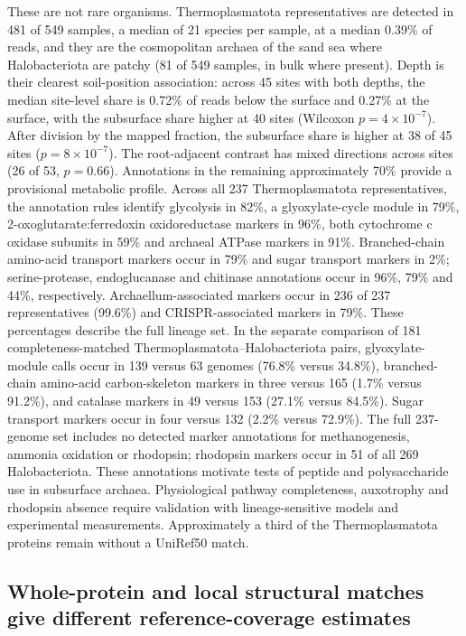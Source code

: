 \documentclass[11pt]{article}
\begin{document}
These are not rare organisms. Thermoplasmatota representatives are detected in 481 of 549 samples,
a median of 21 species per sample, at a median 0.39\% of reads, and they are the cosmopolitan archaea
of the sand sea where Halobacteriota are patchy (81 of 549 samples, in bulk where present). Depth is
their clearest soil-position association: across 45 sites with both depths, the median site-level
share is 0.72\% of reads below the surface and 0.27\% at the surface, with the subsurface share
higher at 40 sites (Wilcoxon $p = 4 \times 10^{-7}$). After division by the mapped fraction,
the subsurface share is higher at 38 of 45 sites ($p = 8 \times 10^{-7}$).
The root-adjacent contrast has mixed directions across sites (26 of 53, $p = 0.66$).
Annotations in the remaining approximately 70\% provide a provisional metabolic profile.
Across all 237 Thermoplasmatota representatives, the annotation rules identify glycolysis in
82\%, a glyoxylate-cycle module in 79\%, 2-oxoglutarate:ferredoxin oxidoreductase markers in 96\%,
both cytochrome c oxidase subunits in 59\% and archaeal ATPase markers in 91\%.
Branched-chain amino-acid transport markers occur in 79\% and sugar transport markers in 2\%;
serine-protease, endoglucanase and chitinase annotations occur in 96\%, 79\% and 44\%, respectively.
Archaellum-associated markers occur in 236 of 237 representatives (99.6\%) and CRISPR-associated
markers in 79\%. These percentages describe the full lineage set. In the separate comparison
of 181 completeness-matched Thermoplasmatota--Halobacteriota pairs, glyoxylate-module calls occur
in 139 versus 63 genomes (76.8\% versus 34.8\%), branched-chain amino-acid carbon-skeleton
markers in three versus 165 (1.7\% versus 91.2\%), and catalase markers in 49 versus 153
(27.1\% versus 84.5\%). Sugar transport markers occur in four versus 132 (2.2\% versus 72.9\%).
The full 237-genome set includes no detected marker annotations for methanogenesis,
ammonia oxidation or rhodopsin; rhodopsin markers occur in 51 of all 269 Halobacteriota.
These annotations motivate tests of peptide and polysaccharide use in subsurface archaea.
Physiological pathway completeness, auxotrophy and rhodopsin absence require validation with
lineage-sensitive models and experimental measurements. Approximately a third of the
Thermoplasmatota proteins remain without a UniRef50 match.

\subsection*{Whole-protein and local structural matches give different reference-coverage estimates}
\end{document}
